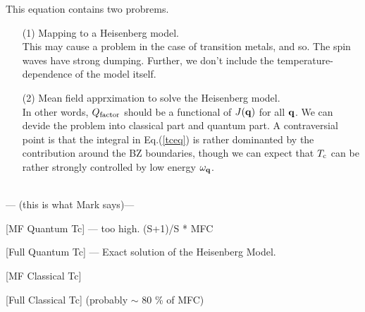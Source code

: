 \documentclass[a4paper,10pt,epsf,fleqn]{article}
\newcommand{\bfq}{{\bf q}}
\newcommand{\req}[1]{Eq.(\ref{#1})}
\begin{document}
This equation contains two probrems.
\begin{enumerate}
\item[(1)] Mapping to a Heisenberg model.\\
This may cause a problem in the case of transition metals, and so.
The spin waves have strong dumping.
Further, we don't include the temperature-dependence of the model itself.



\item[(2)] Mean field apprximation to solve the Heisenberg model.\\ 
In other words, $Q_{\rm factor}$ should be a functional of $J(\bfq)$ for all $\bfq$.
We can devide the problem into classical part and quantum part.
A contraversial point is that the integral in \req{tceq} 
is rather dominanted by the contribution around the BZ boundaries,
though we can expect that $T_{\rm c}$ can be rather strongly controlled
by low energy $\omega_\bfq$. 

\end{enumerate}

~\\

--- (this is what Mark says)---

[MF Quantum Tc] --- too high.  (S+1)/S * MFC

[Full Quantum Tc] --- Exact solution of the Heisenberg Model.
 
[MF Classical Tc] 

[Full Classical Tc] (probably $\sim$ 80 \% of MFC)
\end{document}
